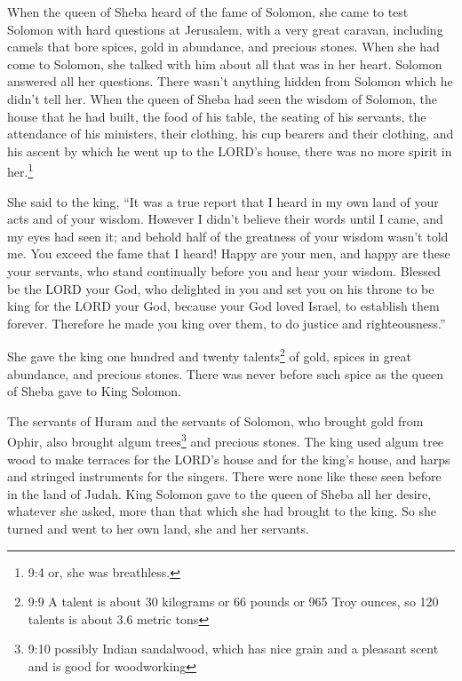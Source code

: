 \mychapter{} \myverse*{}When the queen of Sheba heard of the fame of Solomon, she came
to test Solomon with hard questions at Jerusalem, with a very great caravan, including camels that bore
spices, gold in abundance, and precious stones. When she had come to Solomon, she talked with him about
all that was in her heart.
\myverse{}Solomon answered all her questions. There wasn’t anything hidden from Solomon
which he didn’t tell her.
\myverse{}When the queen of Sheba had seen the wisdom of Solomon, the house that he had
built,
\myverse{}the food of his table, the seating of his servants, the attendance of his ministers,
their clothing, his cup bearers and their clothing, and his ascent by which he went up to the LORD’s house,
there was no more spirit in her.\footnote{9:4 or, she was breathless.}

\myverse{}She said to the king, “It was a true report that I heard in my
own land of your acts and of your wisdom.
\myverse{}However I didn’t believe their words until I came, and my eyes had seen it;
and behold half of the greatness of your wisdom wasn’t told me. You exceed the fame that I heard!
\myverse{}Happy are your men, and happy are these your servants, who stand continually
before you and hear your wisdom.
\myverse{}Blessed be the LORD your God, who delighted in you and set you on his throne
to be king for the LORD your God, because your God loved Israel, to establish them forever. Therefore
he made you king over them, to do justice and righteousness.”

\myverse{}She gave the king one hundred and twenty talents\footnote{9:9 A talent is about 30 kilograms or 66 pounds or 965 Troy ounces, so 120 talents is about 3.6 metric
	tons} of gold, spices in great abundance, and precious stones. There was never before such spice
as the queen of Sheba gave to King Solomon.

\myverse{}The servants of Huram and the servants of Solomon, who brought
gold from Ophir, also brought algum trees\footnote{9:10 possibly Indian sandalwood, which has nice grain and a pleasant scent and is good for woodworking}
and precious stones.
\myverse{}The king used algum tree wood to make terraces for the LORD’s house and for
the king’s house, and harps and stringed instruments for the singers. There were none like these seen
before in the land of Judah.
\myverse{}King Solomon gave to the queen of Sheba all her desire, whatever she asked,
more than that which she had brought to the king. So she turned and went to her own land, she and her
servants.

